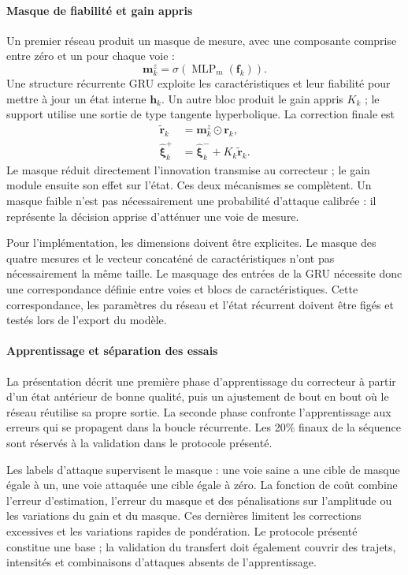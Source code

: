 \paragraph{Masque de fiabilité et gain appris}
Un premier réseau produit un masque de mesure, avec une composante comprise entre zéro et un pour chaque voie :
\begin{equation}
\boldsymbol{m}^z_k=\sigma\!\left(\operatorname{MLP}_m(\boldsymbol{f}_k)\right).
\end{equation}
Une structure récurrente GRU exploite les caractéristiques et leur fiabilité pour mettre à jour un état interne $\boldsymbol{h}_k$. Un autre bloc produit le gain appris $K_k$ ; le support utilise une sortie de type tangente hyperbolique. La correction finale est
\begin{align}
\widetilde{\boldsymbol{r}}_k&=\boldsymbol{m}^z_k\odot\boldsymbol{r}_k,\\
\widehat{\boldsymbol{\xi}}^+_k&=
\widehat{\boldsymbol{\xi}}^-_k+K_k\widetilde{\boldsymbol{r}}_k.
\end{align}
Le masque réduit directement l'innovation transmise au correcteur ; le gain module ensuite son effet sur l'état. Ces deux mécanismes se complètent. Un masque faible n'est pas nécessairement une probabilité d'attaque calibrée : il représente la décision apprise d'atténuer une voie de mesure.

Pour l'implémentation, les dimensions doivent être explicites. Le masque des quatre mesures et le vecteur concaténé de caractéristiques n'ont pas nécessairement la même taille. Le masquage des entrées de la GRU nécessite donc une correspondance définie entre voies et blocs de caractéristiques. Cette correspondance, les paramètres du réseau et l'état récurrent doivent être figés et testés lors de l'export du modèle.

\paragraph{Apprentissage et séparation des essais}
La présentation décrit une première phase d'apprentissage du correcteur à partir d'un état antérieur de bonne qualité, puis un ajustement de bout en bout où le réseau réutilise sa propre sortie. La seconde phase confronte l'apprentissage aux erreurs qui se propagent dans la boucle récurrente. Les 20\% finaux de la séquence sont réservés à la validation dans le protocole présenté.

Les labels d'attaque supervisent le masque : une voie saine a une cible de masque égale à un, une voie attaquée une cible égale à zéro. La fonction de coût combine l'erreur d'estimation, l'erreur du masque et des pénalisations sur l'amplitude ou les variations du gain et du masque. Ces dernières limitent les corrections excessives et les variations rapides de pondération. Le protocole présenté constitue une base ; la validation du transfert doit également couvrir des trajets, intensités et combinaisons d'attaques absents de l'apprentissage.

